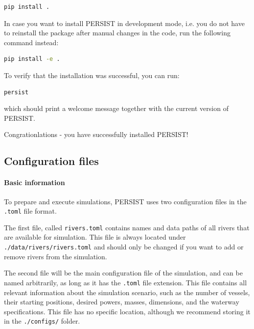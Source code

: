 \documentclass[
	a4paper, %
	12pt, %
]{persist}
\begin{document}
\begin{lstlisting}[language=bash]
	pip install .
\end{lstlisting}

In case you want to install PERSIST in development mode, i.e. you do not have to reinstall the package after manual changes in the code, run the following command instead:

\begin{lstlisting}[language=bash]
	pip install -e .
\end{lstlisting}

To verify that the installation was successful, you can run:

\begin{lstlisting}[language=bash]
	persist 
\end{lstlisting}

which should print a welcome message together with the current version of PERSIST.

Congrationlations - you have successfully installed PERSIST!

\subsection{Configuration files}

\paragraph{Basic information}

To prepare and execute simulations, PERSIST uses two configuration files in the \verb|.toml| file format. 

The first file, called \verb|rivers.toml| contains names and data paths of all rivers that are available for simulation. This file is always located under \verb|./data/rivers/rivers.toml| and should only be changed if you want to add or remove rivers from the simulation.

The second file will be the main configuration file of the simulation, and can be named arbitrarily, as long as it has the \verb|.toml| file extension. This file contains all relevant information about the simulation scenario, such as the number of vessels, their starting positions, desired powers, masses, dimensions, and the waterway specifications. This file has no specific location, although we recommend storing it in the \verb|./configs/| folder.
\end{document}
